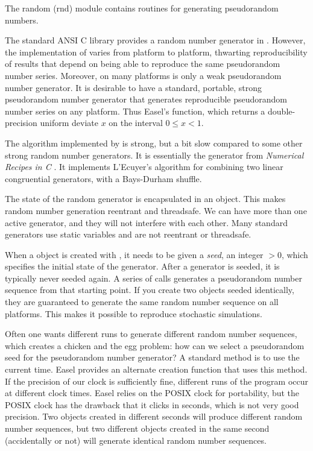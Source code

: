 The random (rnd) module contains routines for generating pseudorandom
numbers.

The standard ANSI C library provides a random number generator in
. However, the implementation of  varies
from platform to platform, thwarting reproducibility of results that
depend on being able to reproduce the same pseudorandom number series.
Moreover, on many platforms  is only a weak pseudorandom
number generator.  It is desirable to have a standard, portable,
strong pseudorandom number generator that generates reproducible
pseudorandom number series on any platform.  Thus Easel's
 function, which returns a double-precision
uniform deviate $x$ on the interval $0 \leq x < 1$.

The algorithm implemented by  is strong, but a
bit slow compared to some other strong random number generators. It is
essentially the  generator from \emph{Numerical Recipes
in C} \citep{Press93}. It implements L'Ecuyer's algorithm for combining
two linear congruential generators, with a Bays-Durham shuffle.

The state of the random generator is encapsulated in an
 object. This makes random number generation
reentrant and threadsafe. We can have more than one active generator,
and they will not interfere with each other. Many standard generators
use static variables and are not reentrant or threadsafe.

When a  object is created with
, it needs to be given a \emph{seed},
an integer $> 0$, which specifies the initial state of the
generator. After a generator is seeded, it is typically never seeded
again. A series of  calls generates a
pseudorandom number sequence from that starting point. If you create
two  objects seeded identically, they are
guaranteed to generate the same random number sequence on all
platforms. This makes it possible to reproduce stochastic simulations.

Often one wants different runs to generate different random number
sequences, which creates a chicken and the egg problem: how can we
select a pseudorandom seed for the pseudorandom number generator? A
standard method is to use the current time. Easel provides an
alternate creation function
 that uses this method. If
the precision of our clock is sufficiently fine, different runs of the
program occur at different clock times. Easel relies on the POSIX
clock for portability, but the POSIX clock has the drawback that it
clicks in seconds, which is not very good precision. Two
 objects created in different seconds will
produce different random number sequences, but two different
 objects created in the same second
(accidentally or not) will generate identical random number sequences.

